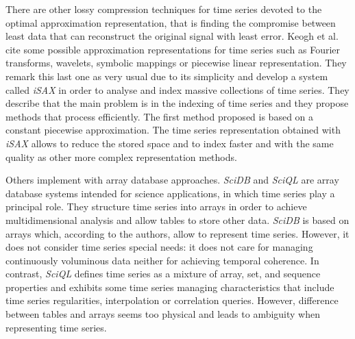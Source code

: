 There are other lossy compression techniques for time series devoted
to the optimal approximation representation, that is finding the
compromise between least data that can reconstruct the original signal
with least error. Keogh et al.\ \cite{keogh01} cite some possible
approximation representations for time series such as Fourier
transforms, wavelets, symbolic mappings or piecewise linear
representation. They remark this last one as very usual due to its
simplicity and develop a system called \emph{iSAX}
\cite{keogh08:isax,keogh10:isax} in order to analyse and index massive
collections of time series. They describe that the main problem is in
the indexing of time series and they propose methods that process
efficiently. The first method proposed is based on a constant
piecewise approximation. The time
series representation obtained with \emph{iSAX} allows to reduce the
stored space and to index faster and with the same quality as other
more complex representation methods.

 



 

 
Others implement  with array database approaches.
\emph{SciDB} \cite{stonebraker09:scidb} and \emph{SciQL}
\cite{zhang11} are array database systems intended for science
applications, in which time series play a principal role. They
structure time series into arrays in order to achieve multidimensional
analysis and allow tables to store other data.  \emph{SciDB} is based
on arrays which, according to the authors, allow to represent time
series. However, it does not consider time series special needs: it
does not care for managing continuously voluminous data neither for
achieving temporal coherence.  In contrast, \emph{SciQL} defines time
series as a mixture of array, set, and sequence properties and
exhibits some time series managing characteristics that include time
series regularities, interpolation or correlation queries.  However,
difference between tables and arrays seems too physical and leads to
ambiguity when representing time series.




